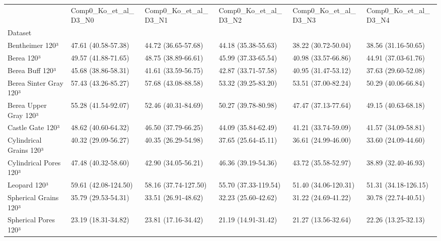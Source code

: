 \begin{tabular}{llllll}
\toprule
 & Comp0_Ko_et_al_D3_N0 & Comp0_Ko_et_al_D3_N1 & Comp0_Ko_et_al_D3_N2 & Comp0_Ko_et_al_D3_N3 & Comp0_Ko_et_al_D3_N4 \\
Dataset &  &  &  &  &  \\
\midrule
Bentheimer 120³ & 47.61 (40.58-57.38) & 44.72 (36.65-57.68) & 44.18 (35.38-55.63) & 38.22 (30.72-50.04) & 38.56 (31.16-50.65) \\
Berea 120³ & 49.57 (41.88-71.65) & 48.75 (38.89-66.61) & 45.99 (37.33-65.54) & 40.98 (33.57-66.86) & 44.91 (37.03-61.76) \\
Berea Buff 120³ & 45.68 (38.86-58.31) & 41.61 (33.59-56.75) & 42.87 (33.71-57.58) & 40.95 (31.47-53.12) & 37.63 (29.60-52.08) \\
Berea Sinter Gray 120³ & 57.43 (43.26-85.27) & 57.68 (43.08-88.58) & 53.32 (39.25-83.20) & 53.51 (37.00-82.24) & 50.29 (40.06-66.84) \\
Berea Upper Gray 120³ & 55.28 (41.54-92.07) & 52.46 (40.31-84.69) & 50.27 (39.78-80.98) & 47.47 (37.13-77.64) & 49.15 (40.63-68.18) \\
Castle Gate 120³ & 48.62 (40.60-64.32) & 46.50 (37.79-66.25) & 44.09 (35.84-62.49) & 41.21 (33.74-59.09) & 41.57 (34.09-58.81) \\
Cylindrical Grains 120³ & 40.32 (29.09-56.27) & 40.35 (26.29-54.98) & 37.65 (25.64-45.11) & 36.61 (24.99-46.00) & 33.60 (24.09-44.60) \\
Cylindrical Pores 120³ & 47.48 (40.32-58.60) & 42.90 (34.05-56.21) & 46.36 (39.19-54.36) & 43.72 (35.58-52.97) & 38.89 (32.40-46.93) \\
Leopard 120³ & 59.61 (42.08-124.50) & 58.16 (37.74-127.50) & 55.70 (37.33-119.54) & 51.40 (34.06-120.31) & 51.31 (34.18-126.15) \\
Spherical Grains 120³ & 35.79 (29.53-54.31) & 33.51 (26.91-48.62) & 32.23 (25.60-42.62) & 31.22 (24.69-41.22) & 30.78 (22.74-40.51) \\
Spherical Pores 120³ & 23.19 (18.31-34.82) & 23.81 (17.16-34.42) & 21.19 (14.91-31.42) & 21.27 (13.56-32.64) & 22.26 (13.25-32.13) \\
\bottomrule
\end{tabular}
